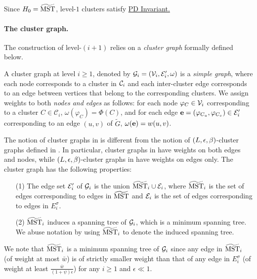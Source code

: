 Since $H_0 = \widetilde{\mathrm{MST}}$, level-$1$ clusters satisfy \hyperlink{PD}{PD Invariant.}

\paragraph{The cluster graph.~} The construction of level-$(i+1)$ relies on a \emph{cluster graph} formally defined below. 

\begin{definition}\label{def:ClusterGraphNew} A cluster graph at level $i \geq 1$, denoted by $\mathcal{G}_i = (\mathcal{V}_i, \mathcal{E}'_i, \omega)$ is a \emph{simple graph}, where each node corresponds to a cluster in $\mathcal{C}_i$ and each inter-cluster edge corresponds to an edge between vertices that belong to the corresponding clusters. We assign  weights to both \emph{nodes and edges} as follows:  for each node $\varphi_C \in \mathcal{V}_i$ corresponding to a cluster $C \in \mathcal{C}_i$, $\omega(\varphi_C) = \Phi(C)$, and for each edge $\mathbf{e} = (\varphi_{C_u},\varphi_{C_v}) \in \mathcal{E}'_i$ corresponding to an edge $(u,v)$ of $\tilde{G}$, $\omega(\mathbf{e}) = w(u,v)$.   
\end{definition} 


The  notion of cluster graphs in  is different from the notion of $(L,\epsilon,\beta)$-cluster graphs defined in . In particular, cluster graphs in  have weights on both edges and nodes, while $(L,\epsilon,\beta)$-cluster graphs in  have weights on edges only.  The cluster graph has the following properties:

\begin{definition}[Properties of $\mg_i$]\label{def:GiProp} \begin{enumerate}[noitemsep]
		\item[(1)] The edge set $\mathcal{E}'_i$ of $\mg_i$ is the union $\widetilde{\mathrm{MST}}_{i}\cup \mathcal{E}_i$, where $\widetilde{\mathrm{MST}}_{i}$ is the set of edges corresponding to edges in $\widetilde{\mathrm{MST}}$ and $\mathcal{E}_i$ is the set of edges corresponding to edges in $E^{\sigma}_i$.
		\item[(2)] $\widetilde{\mathrm{MST}}_{i}$ induces a spanning tree of $\mg_i$, which is a minimum spanning tree. We abuse notation by using $\widetilde{\mathrm{MST}}_{i}$ to denote the induced spanning tree.
	\end{enumerate}
\end{definition}
We note that $\widetilde{\mathrm{MST}}_{i}$ is a minimum spanning tree of $\mg_i$ since any edge in $\widetilde{\mathrm{MST}}_i$ (of weight at most $\bar{w}$) is of strictly smaller weight than that of any edge in $E^{\sigma}_i$ (of weight at least $\frac{\bar{w}}{(1+\psi)\epsilon}$) for any $i\geq 1$ and $\epsilon \ll 1$.

